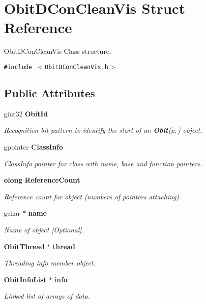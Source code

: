 \section{Obit\-DCon\-Clean\-Vis Struct Reference}
\label{structObitDConCleanVis}
Obit\-DCon\-Clean\-Vis Class structure.  


{\tt \#include $<$Obit\-DCon\-Clean\-Vis.h$>$}

\subsection*{Public Attributes}
\begin{CompactItemize}
\item 
gint32 {\bf Obit\-Id}
\begin{CompactList}\small\item\em Recognition bit pattern to identify the start of an {\bf Obit}{\rm (p.\,\pageref{structObit})} object. \item\end{CompactList}\item 
gpointer {\bf Class\-Info}
\begin{CompactList}\small\item\em Class\-Info pointer for class with name, base and function pointers. \item\end{CompactList}\item 
{\bf olong} {\bf Reference\-Count}
\begin{CompactList}\small\item\em Reference count for object (numbers of pointers attaching). \item\end{CompactList}\item 
gchar $\ast$ {\bf name}
\begin{CompactList}\small\item\em Name of object [Optional]. \item\end{CompactList}\item 
{\bf Obit\-Thread} $\ast$ {\bf thread}
\begin{CompactList}\small\item\em Threading info member object. \item\end{CompactList}\item 
{\bf Obit\-Info\-List} $\ast$ {\bf info}
\begin{CompactList}\small\item\em Linked list of arrays of data. \item\end{CompactList}\item 

\end{CompactItemize}
